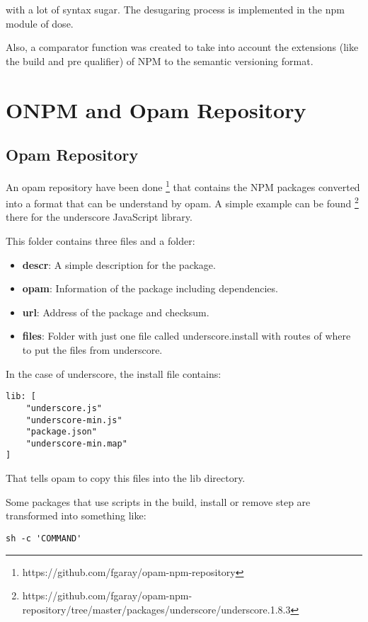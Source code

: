 \documentclass[letterpaper,12pt]{report}
\begin{document}
with a lot of syntax sugar. The desugaring process is implemented in the npm
module of dose.


Also, a comparator function was created to take into account the extensions
(like the build and pre qualifier) of NPM to the semantic versioning format.



\section{ONPM and Opam Repository}

\subsection{Opam Repository}

An opam repository have been done
\footnote{https://github.com/fgaray/opam-npm-repository} that contains the NPM
packages converted into a format that can be understand by opam. A simple
example can be found \footnote{https://github.com/fgaray/opam-npm-repository/tree/master/packages/underscore/underscore.1.8.3}
there for the underscore JavaScript library.

This folder contains three files and a folder:

\begin{itemize}
  \item \textbf{descr}: A simple description for the package.
  \item \textbf{opam}: Information of the package including dependencies.
  \item \textbf{url}: Address of the package and checksum.
  \item \textbf{files}: Folder with just one file called underscore.install with
    routes of where to put the files from underscore.
\end{itemize}

In the case of underscore, the install file contains:

\begin{verbatim}
lib: [
    "underscore.js" 
    "underscore-min.js"
    "package.json"
    "underscore-min.map"
]
\end{verbatim}

That tells opam to copy this files into the lib directory.


Some packages that use scripts in the build, install or remove step are
transformed into something like:

\begin{verbatim}
sh -c 'COMMAND'
\end{verbatim}
\end{document}
